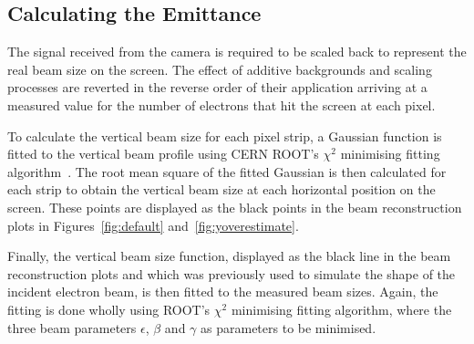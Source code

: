\subsection{Calculating the Emittance}

The signal received from the camera is required to be scaled back to represent
the real beam size on the screen. The effect of additive backgrounds and scaling
processes are reverted in the reverse order of their application arriving at a
measured value for the number of electrons that hit the screen at each pixel.

To calculate the vertical beam size for each pixel strip, a Gaussian function is
fitted to the vertical beam profile using CERN ROOT's \(\chi^2\) minimising
fitting algorithm~\cite{Brun:1997pa}.
The root mean square of the fitted
Gaussian is then calculated for each strip to obtain the vertical beam size at
each horizontal position on the screen. These points are displayed as the black
points in the beam reconstruction plots in Figures~\ref{fig:default}
and~\ref{fig:yoverestimate}.

Finally, the vertical beam size function, displayed as the black line in the
beam reconstruction plots and which was previously used to simulate the shape of
the incident electron beam, is then fitted to the measured beam sizes. Again,
the fitting is done wholly using ROOT's \(\chi^2\) minimising fitting algorithm,
where the three beam parameters \(\epsilon\), \(\beta\) and \(\gamma\) as
parameters to be minimised.

